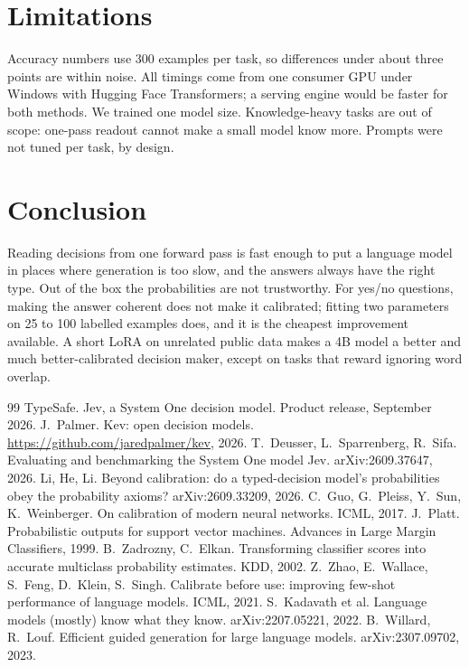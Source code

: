 \documentclass[10pt,twocolumn]{article}
\begin{document}
\section{Limitations}

Accuracy numbers use 300 examples per task, so differences under about three points are within noise. All timings
come from one consumer GPU under Windows with Hugging Face Transformers; a serving engine would be faster for both
methods. We trained one model size. Knowledge-heavy tasks are out of scope: one-pass readout cannot make a small model
know more. Prompts were not tuned per task, by design.

\section{Conclusion}

Reading decisions from one forward pass is fast enough to put a language model in places where generation is too
slow, and the answers always have the right type. Out of the box the probabilities are not trustworthy.
For yes/no questions, making the answer coherent does not make it calibrated; fitting two parameters on 25 to 100
labelled examples does, and it is the cheapest improvement available. A short LoRA on unrelated public data makes a 4B model a
better and much better-calibrated decision maker, except on tasks that reward ignoring word overlap.

\begin{thebibliography}{99}\small
{} TypeSafe. Jev, a System One decision model. Product release, September 2026.
 J.~Palmer. Kev: open decision models. \url{https://github.com/jaredpalmer/kev}, 2026.
 T.~Deusser, L.~Sparrenberg, R.~Sifa. Evaluating and benchmarking the System One model Jev. arXiv:2609.37647, 2026.
 Li, He, Li. Beyond calibration: do a typed-decision model's probabilities obey the probability axioms? arXiv:2609.33209, 2026.
 C.~Guo, G.~Pleiss, Y.~Sun, K.~Weinberger. On calibration of modern neural networks. ICML, 2017.
 J.~Platt. Probabilistic outputs for support vector machines. Advances in Large Margin Classifiers, 1999.
 B.~Zadrozny, C.~Elkan. Transforming classifier scores into accurate multiclass probability estimates. KDD, 2002.
 Z.~Zhao, E.~Wallace, S.~Feng, D.~Klein, S.~Singh. Calibrate before use: improving few-shot performance of language models. ICML, 2021.
 S.~Kadavath et al. Language models (mostly) know what they know. arXiv:2207.05221, 2022.
 B.~Willard, R.~Louf. Efficient guided generation for large language models. arXiv:2307.09702, 2023.
\end{thebibliography}
\end{document}
